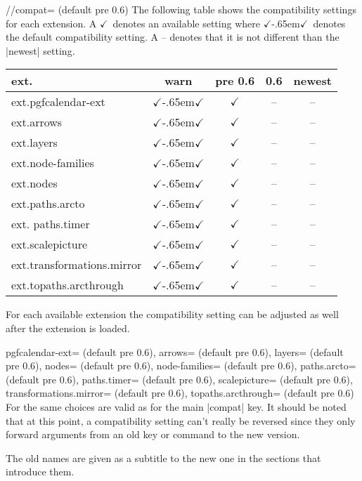 \begin{multicols}{2}
\begin{key}{/\tikzext/compat= (default pre 0.6)}
  The following table shows the compatibility settings for each extension.
  \newcommand*\X{$\checkmark$}%
  \newcommand*\Xdef{\X\kern-.65em\X}%
  A \X\ denotes an available setting where \Xdef\ denotes the default compatibility setting.
  A -- denotes that it is not different than the |newest| setting.
  \begin{center}
  \begin{tabular}{>{\ttfamily ext.}l cccc}
    \toprule
    \multicolumn{1}{l}{Extension} & warn  & pre 0.6 & 0.6 & newest \\ \midrule
    pgfcalendar-ext               & \Xdef &   \X    & --  &   --   \\ \midrule[.5\lightrulewidth]
    arrows                        & \Xdef &   \X    & --  &   --   \\
    layers                        & \Xdef &   \X    & --  &   --   \\
    node-families                 & \Xdef &   \X    & --  &   --   \\
    nodes                         & \Xdef &   \X    & --  &   --   \\
    paths.arcto                   & \Xdef &   \X    & --  &   --   \\ \addlinespace
    paths.timer                   & \Xdef &   \X    & --  &   --   \\
    scalepicture                  & \Xdef &   \X    & --  &   --   \\
    transformations.mirror        & \Xdef &   \X    & --  &   --   \\
    topaths.arcthrough            & \Xdef &   \X    & --  &   --   \\ \bottomrule
  \end{tabular}
  \end{center}
\end{key}

\newcolumn\noindent
For each available extension the compatibility setting can be adjusted as well
after the extension is loaded.
\begin{keylist}{%
  pgfcalendar-ext= (default pre 0.6),
  arrows= (default pre 0.6),
  layers= (default pre 0.6),
  nodes= (default pre 0.6),
  node-families= (default pre 0.6),
  paths.arcto= (default pre 0.6),
  paths.timer= (default pre 0.6),
  scalepicture= (default pre 0.6),
  transformations.mirror= (default pre 0.6),
  topaths.arcthrough= (default pre 0.6)%
}
  For  the same choices are valid as for the main |compat| key.
  It should be noted that at this point, a compatibility setting can't really be reversed
  since they only forward arguments from an old key or command to the new version.
  
  The old names are given as a subtitle to the new one in the sections that introduce them.
\end{keylist}
\end{multicols}